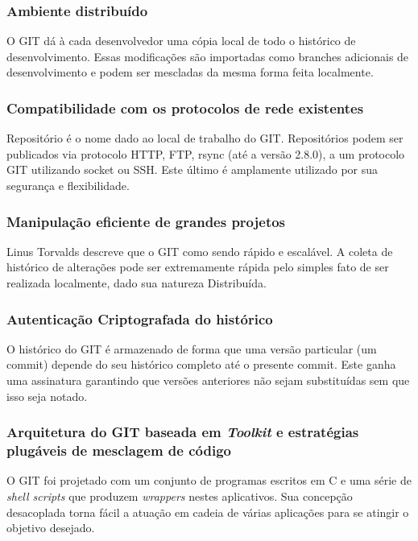 \documentclass[
	article,			%
	12pt,				%
	oneside,			%
	a4paper,			%
	english,			
	brazil,
	sumario=tradicional
	]{abntex2}
\begin{document}
\subsubsection{Ambiente distribuído}

O GIT dá à cada desenvolvedor uma cópia local de todo o histórico de desenvolvimento. Essas modificações são importadas como branches adicionais de desenvolvimento e podem ser mescladas da mesma forma feita localmente. \cite{gitscm.3}

\subsubsection{Compatibilidade com os protocolos de rede existentes}
Repositório é o nome dado ao local de trabalho do GIT. Repositórios podem ser publicados via protocolo HTTP, FTP, rsync (até a versão 2.8.0), a um protocolo GIT utilizando socket ou SSH. Este último é amplamente utilizado por sua segurança e flexibilidade.

\subsubsection{Manipulação eficiente de grandes projetos}
Linus Torvalds descreve que o GIT como sendo rápido e escalável. A coleta de histórico de alterações pode ser extremamente rápida pelo simples fato de ser realizada localmente, dado sua natureza Distribuída. \cite{gitscm.2}

\subsubsection{Autenticação Criptografada do histórico}
O histórico do GIT é armazenado de forma que uma versão particular (um commit) depende do seu histórico completo até o presente commit. Este ganha uma assinatura garantindo que versões anteriores não sejam substituídas sem que isso seja notado.

\subsubsection{Arquitetura do GIT baseada em \textit{Toolkit} e estratégias plugáveis de mesclagem de código}
O GIT foi projetado com um conjunto de programas escritos em C e uma série de \textit{shell scripts} que produzem \textit{wrappers} nestes aplicativos. Sua concepção desacoplada torna fácil a atuação em cadeia de várias aplicações para se atingir o objetivo desejado.
\end{document}
